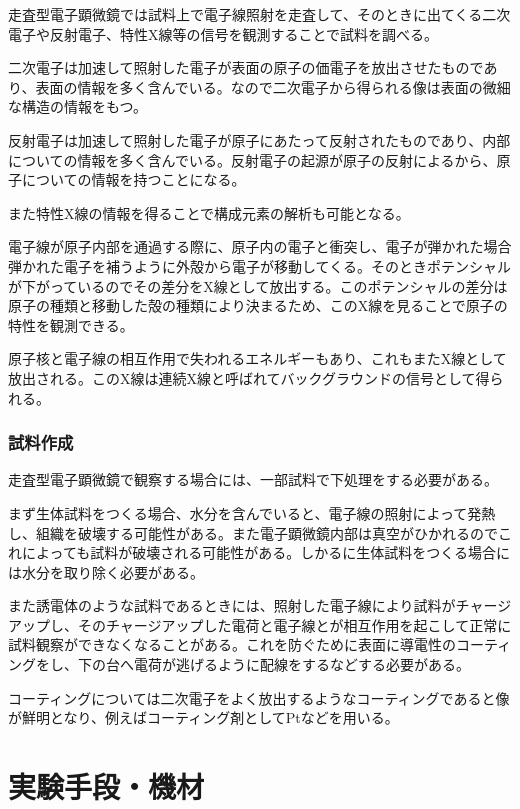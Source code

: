 \documentclass[titlepage,fontsize=10.5pt]{jlreq}
\begin{document}
    走査型電子顕微鏡では試料上で電子線照射を走査して、そのときに出てくる二次電子や反射電子、特性X線等の信号を観測することで試料を調べる。

    二次電子は加速して照射した電子が表面の原子の価電子を放出させたものであり、表面の情報を多く含んでいる。なので二次電子から得られる像は表面の微細な構造の情報をもつ。

    反射電子は加速して照射した電子が原子にあたって反射されたものであり、内部についての情報を多く含んでいる。反射電子の起源が原子の反射によるから、原子についての情報を持つことになる。

    また特性X線の情報を得ることで構成元素の解析も可能となる。

    電子線が原子内部を通過する際に、原子内の電子と衝突し、電子が弾かれた場合弾かれた電子を補うように外殻から電子が移動してくる。そのときポテンシャルが下がっているのでその差分をX線として放出する。このポテンシャルの差分は原子の種類と移動した殻の種類により決まるため、このX線を見ることで原子の特性を観測できる。

    原子核と電子線の相互作用で失われるエネルギーもあり、これもまたX線として放出される。このX線は連続X線と呼ばれてバックグラウンドの信号として得られる。

    \subsubsection{試料作成} %
    \label{ssub:試料作成}
    走査型電子顕微鏡で観察する場合には、一部試料で下処理をする必要がある。
    
    まず生体試料をつくる場合、水分を含んでいると、電子線の照射によって発熱し、組織を破壊する可能性がある。また電子顕微鏡内部は真空がひかれるのでこれによっても試料が破壊される可能性がある。しかるに生体試料をつくる場合には水分を取り除く必要がある。

    また誘電体のような試料であるときには、照射した電子線により試料がチャージアップし、そのチャージアップした電荷と電子線とが相互作用を起こして正常に試料観察ができなくなることがある。これを防ぐために表面に導電性のコーティングをし、下の台へ電荷が逃げるように配線をするなどする必要がある。

    コーティングについては二次電子をよく放出するようなコーティングであると像が鮮明となり、例えばコーティング剤としてPtなどを用いる。


\section{実験手段・機材}
    \label{sec.実験手段・機材}
\end{document}
